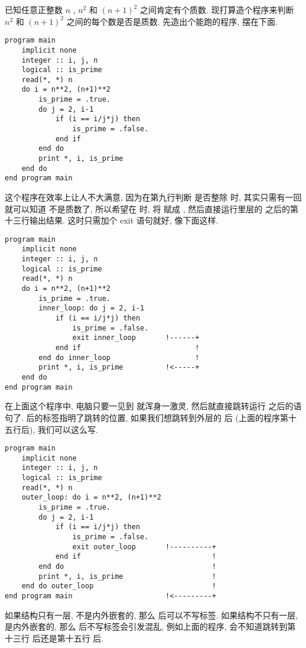 已知任意正整数 $n$ , $n^2$ 和 $(n+1)^2$ 之间肯定有个质数. 现打算造个程序来判断 $n^2$ 和 $(n+1)^2$ 之间的每个数是否是质数. 先造出个能跑的程序, 摆在下面.
\begin{lstlisting}
program main
    implicit none
    integer :: i, j, n
    logical :: is_prime
    read(*, *) n
    do i = n**2, (n+1)**2
        is_prime = .true.
        do j = 2, i-1
            if (i == i/j*j) then
                is_prime = .false.
            end if
        end do
        print *, i, is_prime
    end do
end program main
\end{lstlisting}
这个程序在效率上让人不大满意, 因为在第九行判断  是否整除  时, 其实只需有一回  就可以知道  不是质数了, 所以希望在  时, 将  赋成 , 然后直接运行里层的  之后的第十三行输出结果. 这时只需加个 exit 语句就好, 像下面这样.
\begin{lstlisting}
program main
    implicit none
    integer :: i, j, n
    logical :: is_prime
    read(*, *) n
    do i = n**2, (n+1)**2
        is_prime = .true.
        inner_loop: do j = 2, i-1
            if (i == i/j*j) then
                is_prime = .false.
                exit inner_loop       !------+
            end if                           !
        end do inner_loop                    !
        print *, i, is_prime          !<-----+
    end do
end program main
\end{lstlisting}
在上面这个程序中, 电脑只要一见到  就浑身一激灵, 然后就直接跳转运行  之后的语句了.  后的标签指明了跳转的位置, 如果我们想跳转到外层的  后 (上面的程序第十五行后), 我们可以这么写.
\begin{lstlisting}
program main
    implicit none
    integer :: i, j, n
    logical :: is_prime
    read(*, *) n
    outer_loop: do i = n**2, (n+1)**2
        is_prime = .true.
        do j = 2, i-1
            if (i == i/j*j) then
                is_prime = .false.
                exit outer_loop       !----------+
            end if                               !
        end do                                   !
        print *, i, is_prime                     !
    end do outer_loop                            !
end program main                      !<---------+
\end{lstlisting}

如果结构只有一层, 不是内外嵌套的, 那么  后可以不写标签. 如果结构不只有一层, 是内外嵌套的, 那么  后不写标签会引发混乱, 例如上面的程序, 会不知道跳转到第十三行  后还是第十五行  后.

